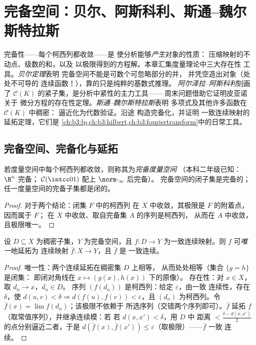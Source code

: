 \chapter{完备空间：贝尔、阿斯科利、斯通–魏尔斯特拉斯}
\label{ch:b3:complete}

完备性——每个柯西列都收敛——是
使分析能够\emph{产生}对象的性质：
压缩映射的不动点、级数的和，以及
以极限得到的方程解。本章汇集度量理论中三大存在性
工具。\emph{贝尔定理}表明
完备空间不能是可数个可忽略部分的并，
并凭空造出对象（处处不可导的
连续函数！），靠的只是纯粹的基数式推理。
\emph{阿尔泽拉–阿斯科利}刻画了
$\mathcal C(K)$ 的紧子集，是分析中紧性的主力工具——
周末问题借助它证明皮亚诺关于
微分方程的存在性定理。\emph{斯通–魏尔斯特拉斯}表明
多项式及其他许多函数在 $\mathcal C(K)$ 中稠密：
逼近化为代数验证。沿途
构造完备化，并证明
一致连续映射的延拓定理，它们是
\cref{ch:b3:lp,ch:b3:hilbert,ch:b3:fouriertransform}中的日常工具。

\section{完备空间、完备化与延拓}

\begin{definition}\label{def:b3:complete:complete}
若度量空间中每个柯西列都收敛，则称其为\emph{完备度量空间}
（本科二年级已知：$\R^n$ 完备；
$\mathcal C(\intcc01)$ 配上 $\norm\cdot_\infty$ 后完备）。
完备空间的闭子集是完备的；
任一度量空间的完备子集都是闭的。
\end{definition}

\begin{proof}
对于两个结论：闭集 $F$ 中的柯西列
在 $X$ 中收敛，其极限是 $F$ 的附着点，因而属于 $F$；
在 $X$ 中收敛、取自完备集 $A$ 的序列是柯西列，
从而在 $A$ 中收敛，且极限唯一。
\end{proof}

\begin{theorem}[一致连续映射的延拓]
\label{thm:b3:complete:extension}
设 $D \subseteq X$ 为稠密子集，$Y$ 为完备空间，且 $f \colon D \to
Y$ 为一致连续映射。则 $f$ 可\emph{唯一}地延拓为
连续映射 $\bar f \colon X \to Y$，且 $\bar f$ 是
一致连续。
\end{theorem}

\begin{proof}
唯一性：两个连续延拓在稠密集 $D$ 上相等，
从而处处相等（集合 $\{g = h\}$ 是闭集：
即闭对角线在 $x\mapsto(g(x), h(x))$ 下的原像）。
存在性：对 $x \in X$，取 $d_n \to x$，$d_n \in D$。
序列 $(f(d_n))$ 是柯西列：给定 $\varepsilon$，由一致
连续性，存在 $\delta$，使 $d(u,v) < \delta \Rightarrow
d(f(u), f(v)) < \varepsilon$，且 $(d_n)$ 为柯西列。令
$\bar f(x) = \lim f(d_n)$；该极限不依赖于
所选序列（交错两个序列即可）。$\bar f$ 延拓 $f$
（取常值序列），并继承连续模：若
若 $d(x, x') < \delta$，用 $D$ 中
距离 $< \frac{\delta - d(x,x')}2$ 的点分别逼近二者，于是 $d(\bar f(x), \bar
f(x')) \leq \varepsilon$（取极限）——$\bar f$ 一致
连续。
\end{proof}

